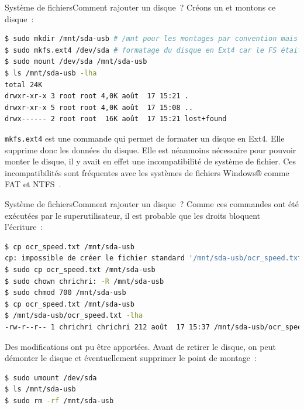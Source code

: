 \documentclass{beamer}
\begin{document}
    \begin{frame}[fragile]{Système de fichiers}{Comment rajouter un disque~?}
        Créons un  et montons ce disque~:
        \begin{lstlisting}[language=bash]
$ sudo mkdir /mnt/sda-usb # /mnt pour les montages par convention mais peut être ailleurs
$ sudo mkfs.ext4 /dev/sda # formatage du disque en Ext4 car le FS était incompatible
$ sudo mount /dev/sda /mnt/sda-usb
$ ls /mnt/sda-usb -lha
total 24K
drwxr-xr-x 3 root root 4,0K août  17 15:21 .
drwxr-xr-x 5 root root 4,0K août  17 15:08 ..
drwx------ 2 root root  16K août  17 15:21 lost+found
        \end{lstlisting}
        \begin{dangercolorbox}
            \lstinline{mkfs.ext4} est une commande qui permet de formater un disque en Ext4.
            Elle supprime donc les données du disque.
            Elle est néanmoins nécessaire pour pouvoir monter le disque, il y avait en effet une incompatibilité de système de fichier.
            Ces incompatibilités sont fréquentes avec les systèmes de fichiers Windows® comme FAT et NTFS~.
        \end{dangercolorbox}
    \end{frame}

    \begin{frame}[fragile]{Système de fichiers}{Comment rajouter un disque~?}
        Comme ces commandes ont été exécutées par le superutilisateur, il est probable que les droits bloquent l'écriture~:
        \begin{lstlisting}[language=bash]
$ cp ocr_speed.txt /mnt/sda-usb
cp: impossible de créer le fichier standard '/mnt/sda-usb/ocr_speed.txt': Permission non accordée
$ sudo cp ocr_speed.txt /mnt/sda-usb
$ sudo chown chrichri: -R /mnt/sda-usb
$ sudo chmod 700 /mnt/sda-usb
$ cp ocr_speed.txt /mnt/sda-usb
$ /mnt/sda-usb/ocr_speed.txt -lha
-rw-r--r-- 1 chrichri chrichri 212 août  17 15:37 /mnt/sda-usb/ocr_speed.txt
        \end{lstlisting}
        Des modifications ont pu être apportées.
        \bigbreak
        Avant de retirer le disque, on peut démonter le disque et éventuellement supprimer le point de montage~:
        \begin{lstlisting}[language=bash]
$ sudo umount /dev/sda
$ ls /mnt/sda-usb
$ sudo rm -rf /mnt/sda-usb
        \end{lstlisting}
    \end{frame}
\end{document}
